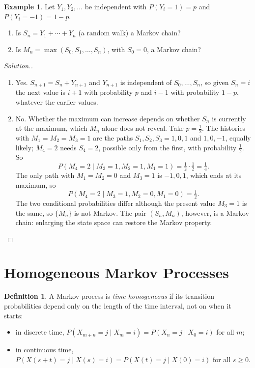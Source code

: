\documentclass[12pt,a4paper]{report}
\theoremstyle{definition}
\newtheorem{defn}[thm]{Definition}
\newtheorem{exa}[thm]{Example}
\newenvironment{solution}
  {\renewcommand{\qedsymbol}{}\begin{proof}[\textit{Solution}.]}
  {\end{proof}}
\begin{document}
\begin{exa}
\label{ex:markovornot}
Let $Y_1, Y_2, \dots$ be independent with $P(Y_i = 1) = p$ and $P(Y_i = -1) = 1 - p$.
\begin{enumerate}
\item[(a)] Is $S_n = Y_1 + \cdots + Y_n$ (a random walk) a Markov chain?
\item[(b)] Is $M_n = \max(S_0, S_1, \dots, S_n)$, with $S_0 = 0$, a Markov chain?
\end{enumerate}
\end{exa}

\begin{solution}
\begin{enumerate}
\item[(a)] Yes. $S_{n + 1} = S_n + Y_{n + 1}$ and $Y_{n + 1}$ is independent of $S_0, \dots, S_n$, so
given $S_n = i$ the next value is $i + 1$ with probability $p$ and $i - 1$ with probability
$1 - p$, whatever the earlier values.
\item[(b)] No. Whether the maximum can increase depends on whether $S_n$ is currently at the
maximum, which $M_n$ alone does not reveal. Take $p = \frac12$. The histories with
$M_1 = M_2 = M_3 = 1$ are the paths $S_1, S_2, S_3 = 1, 0, 1$ and $1, 0, -1$, equally likely; $M_4 = 2$
needs $S_4 = 2$, possible only from the first, with probability $\frac12$. So
\[P(M_4 = 2\mid M_3 = 1, M_2 = 1, M_1 = 1) = \tfrac12\cdot\tfrac12 = \tfrac14 .\]
The only path with $M_1 = M_2 = 0$ and $M_3 = 1$ is $-1, 0, 1$, which ends at its maximum, so
\[P(M_4 = 2\mid M_3 = 1, M_2 = 0, M_1 = 0) = \tfrac12 .\]
The two conditional probabilities differ although the present value $M_3 = 1$ is the same,
so $\{M_n\}$ is not Markov. The pair $(S_n, M_n)$, however, is a Markov chain: enlarging the
state space can restore the Markov property.
\end{enumerate}
\end{solution}

\section{Homogeneous Markov Processes}

\begin{defn}
\label{def:homogeneous}
A Markov process is \emph{time-homogeneous} if its transition probabilities depend only on
the length of the time interval, not on when it starts:
\begin{itemize}
\item in discrete time, $P(X_{m + n} = j\mid X_m = i) = P(X_n = j\mid X_0 = i)$ for all $m$;
\item in continuous time, $P(X(s + t) = j\mid X(s) = i) = P(X(t) = j\mid X(0) = i)$ for all $s\geq 0$.
\end{itemize}
\end{defn}
\end{document}
